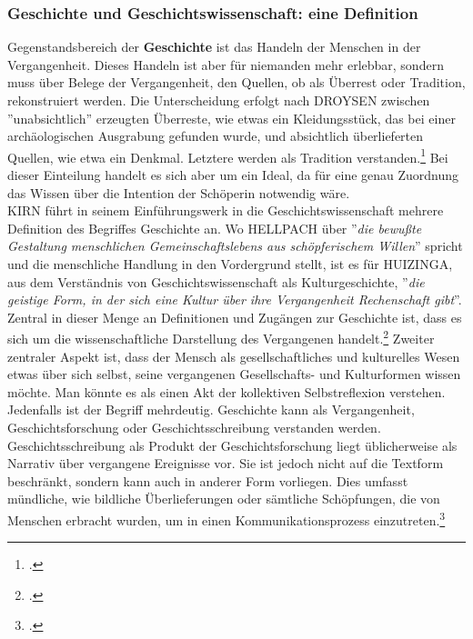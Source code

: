 \documentclass[12pt,a4paper]{article}
\begin{document}
\subsubsection{Geschichte und Geschichtswissenschaft: eine Definition}
Gegenstandsbereich der \textbf{Geschichte} ist das Handeln der Menschen in der Vergangenheit. Dieses Handeln ist aber für niemanden mehr erlebbar, sondern muss über Belege der Vergangenheit, den Quellen, ob als Überrest oder Tradition, rekonstruiert werden. Die Unterscheidung erfolgt nach DROYSEN zwischen ''unabsichtlich'' erzeugten Überreste, wie etwas ein Kleidungsstück, das bei einer archäologischen Ausgrabung gefunden wurde, und absichtlich überlieferten Quellen, wie etwa ein Denkmal. Letztere werden als Tradition verstanden.\footcite[][49–55]{schulz2010neuere} Bei dieser Einteilung handelt es sich aber um ein Ideal, da für eine genau Zuordnung das Wissen über die Intention der Schöperin notwendig wäre. 
\\
KIRN führt in seinem Einführungswerk in die Geschichtswissenschaft mehrere Definition des Begriffes Geschichte an. Wo HELLPACH über ''\textit{die bewußte Gestaltung menschlichen Gemeinschaftslebens aus schöpferischem Willen}'' spricht und die menschliche Handlung in den Vordergrund stellt, ist es für HUIZINGA, aus dem Verständnis von Geschichtswissenschaft als Kulturgeschichte, ''\textit{die geistige Form, in der sich eine Kultur über ihre Vergangenheit Rechenschaft gibt}''. Zentral in dieser Menge an Definitionen und Zugängen zur Geschichte ist, dass es sich um die wissenschaftliche Darstellung des Vergangenen handelt.\footcite[][S.7-12]{KirnPaul2015EidG} Zweiter zentraler Aspekt ist, dass der Mensch als gesellschaftliches und kulturelles Wesen etwas über sich selbst, seine vergangenen Gesellschafts- und Kulturformen wissen möchte. Man könnte es als einen Akt der kollektiven Selbstreflexion verstehen.
\\
Jedenfalls ist der Begriff mehrdeutig. Geschichte kann als Vergangenheit, Geschichtsforschung oder Geschichtsschreibung verstanden werden. Geschichtsschreibung als Produkt der Geschichtsforschung liegt üblicherweise als Narrativ über vergangene Ereignisse vor. Sie ist jedoch nicht auf die Textform beschränkt, sondern kann auch in anderer Form vorliegen. Dies umfasst mündliche, wie bildliche Überlieferungen oder sämtliche Schöpfungen, die von Menschen erbracht wurden, um in einen Kommunikationsprozess einzutreten.\footcite[][S.5-7]{frank2018visualisierungswerkzeuge}
\\
\end{document}
